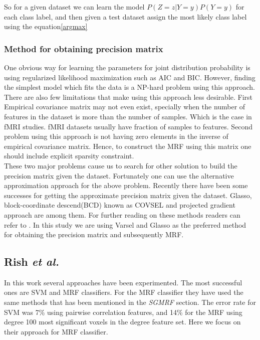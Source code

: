 \documentclass{article} %
\begin{document}
So for a given dataset we can learn the model $ P(Z=z|Y=y)P(Y=y)$ for each 
class label, and then given a test dataset assign the most likely class 
label using the equation\eqref{argmax} \cite{Rish2014Book}  

\subsubsection{Method for obtaining precision matrix}  
One obvious way for learning the parameters for joint distribution probability 
is using regularized likelihood maximization such as AIC and BIC. However, 
finding the simplest model which fits the data is a NP-hard problem using this 
approach. There are also few limitations that make using this approach less 
desirable. First Empirical covariance matrix may not even exist, specially when 
the number of features in the dataset is more than the number of samples. Which 
is the case in fMRI studies. fMRI datasets usually have fraction of samples to 
features. Second problem using this approach is not having zero elements in the 
inverse of empirical covariance matrix. Hence, to construct the MRF using this 
matrix one should include explicit sparsity constraint.\cite{Rish2014Book} \\

These two major problems cause us to search for other solution to build the 
precision matrix given the dataset. Fortunately one can use the alternative 
approximation approach for the above problem. Recently there have been some 
successes for getting the approximate precision matrix given the dataset. 
Glasso\cite{glasso}, block-coordinate descend(BCD) known as COVSEL and projected gradient 
approach are among them. For further reading on these methods readers can 
refer to \cite{Rish2014Book}. In this study we are using Varsel and Glasso as 
the preferred method for obtaining the precision matrix and subsequently MRF.   

\subsection{Rish \emph{et al.}}
In this work several approaches have been experimented. The most successful ones are SVM and MRF classifiers. For the MRF classifier they have used the same methods that has been mentioned in the \textit{SGMRF} section. The error rate for SVM was 7\% using pairwise correlation features, and 14\% for the MRF using degree 100 most significant voxels in the degree feature set. Here we focus on their approach for MRF classifier.\\
\end{document}
